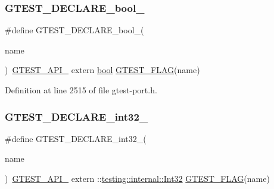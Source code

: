\mbox{\label{gtest-port_8h_a14eb0e9c6e0df765d1fbfd2db6966d14}} 
\subsubsection{\texorpdfstring{G\+T\+E\+S\+T\+\_\+\+D\+E\+C\+L\+A\+R\+E\+\_\+bool\+\_\+}{GTEST\_DECLARE\_bool\_}}
{\footnotesize\ttfamily \#define G\+T\+E\+S\+T\+\_\+\+D\+E\+C\+L\+A\+R\+E\+\_\+bool\+\_\+(\begin{DoxyParamCaption}\item[{}]{name }\end{DoxyParamCaption})~\hyperlink{gtest-port_8h_aa73be6f0ba4a7456180a94904ce17790}{G\+T\+E\+S\+T\+\_\+\+A\+P\+I\+\_\+} extern \hyperlink{classbool}{bool} \hyperlink{gtest-port_8h_a828f4e34a1c4b510da50ec1563e3562a}{G\+T\+E\+S\+T\+\_\+\+F\+L\+AG}(name)}



Definition at line 2515 of file gtest-\/port.\+h.

\mbox{\label{gtest-port_8h_aab2ee98cb616054b1d3a7dc71efe81fc}} 
\subsubsection{\texorpdfstring{G\+T\+E\+S\+T\+\_\+\+D\+E\+C\+L\+A\+R\+E\+\_\+int32\+\_\+}{GTEST\_DECLARE\_int32\_}}
{\footnotesize\ttfamily \#define G\+T\+E\+S\+T\+\_\+\+D\+E\+C\+L\+A\+R\+E\+\_\+int32\+\_\+(\begin{DoxyParamCaption}\item[{}]{name }\end{DoxyParamCaption})~\hyperlink{gtest-port_8h_aa73be6f0ba4a7456180a94904ce17790}{G\+T\+E\+S\+T\+\_\+\+A\+P\+I\+\_\+} extern \+::\hyperlink{namespacetesting_1_1internal_a8ee38faaf875f133358abaf9bc056cec}{testing\+::internal\+::\+Int32} \hyperlink{gtest-port_8h_a828f4e34a1c4b510da50ec1563e3562a}{G\+T\+E\+S\+T\+\_\+\+F\+L\+AG}(name)}



